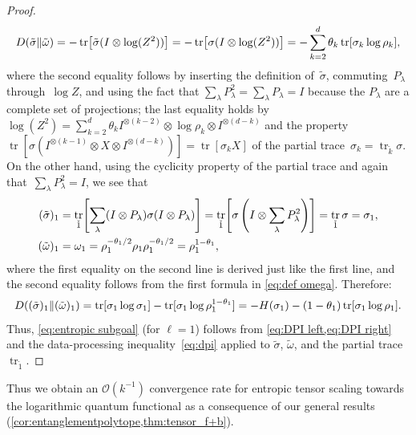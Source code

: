 \documentclass[11pt,letterpaper]{article}
\numberwithin{equation}{section}
\newcommand{\ot}{\otimes}
\DeclareMathOperator{\tr}{tr}
\begin{document}
\begin{proof}
\begin{align}
    D(\tilde\sigma \Vert \tilde\omega)
= -\tr\mleft[ \tilde\sigma (I \ot \log(Z^2)) \mright]
= -\tr\mleft[ \sigma (I \ot \log(Z^2)) \mright]
= -\sum_{k=2}^d \theta_k \tr\mleft[ \sigma_k \log \rho_k \mright],
\end{align}
where the second equality follows by inserting the definition of~$\tilde\sigma$, commuting~$P_\lambda$ through~$\log Z$, and using the fact that $\sum_\lambda P_\lambda^2 = \sum_\lambda P_\lambda = I$ because the $P_\lambda$ are a complete set of projections;
the last equality holds by $\log(Z^2) = \sum_{k=2}^d \theta_k I^{\ot(k-2)} \ot \log\rho_k \ot I^{\ot(d-k)}$ and the property~$\tr[\sigma(I^{\ot(k-1)} \ot X \ot I^{\ot(d-k)})] = \tr[\sigma_k X]$ of the partial trace~$\sigma_k = \tr_{\check k}\sigma$.
On the other hand, using the cyclicity property of the partial trace and again that~$\sum_\lambda P_\lambda^2 = I$, we see that
\begin{align*}
    (\tilde\sigma)_1
&= \tr_{\check1} \mleft[ \sum_\lambda (I \ot P_\lambda) \sigma (I \ot P_\lambda) \mright]
= \tr_{\check1} \mleft[ \sigma \left(I \ot \sum_\lambda P_\lambda^2 \right) \mright]
= \tr_{\check1} \sigma = \sigma_1, \\
(\tilde\omega)_1
&= \omega_1
= \rho_1^{-\theta_1/2} \rho_1 \rho_1^{-\theta_1/2}
= \rho_1^{1-\theta_1},
\end{align*}
where the first equality on the second line is derived just like the first line, and the second equality follows from the first formula in \cref{eq:def omega}.
Therefore:
\begin{align}\label{eq:DPI right}
    D\mleft( (\tilde\sigma)_1 \Vert (\tilde\omega)_1 \mright)
= \tr[\sigma_1 \log \sigma_1] - \tr[\sigma_1 \log \rho_1^{1-\theta_1}]
= -H(\sigma_1) - (1-\theta_1) \tr[\sigma_1 \log \rho_1].
\end{align}
Thus, \cref{eq:entropic subgoal} (for $\ell=1$) follows from \cref{eq:DPI left,eq:DPI right} and the data-processing inequality~\eqref{eq:dpi} applied to $\tilde\sigma$, $\tilde\omega$, and the partial trace~$\tr_{\check1}$.
\end{proof}

Thus we obtain an $\mathcal{O}(k^{-1})$ convergence rate for entropic tensor scaling towards the logarithmic quantum functional as a consequence of our general results (\cref{cor:entanglementpolytope,thm:tensor_f+b}).
\end{document}
